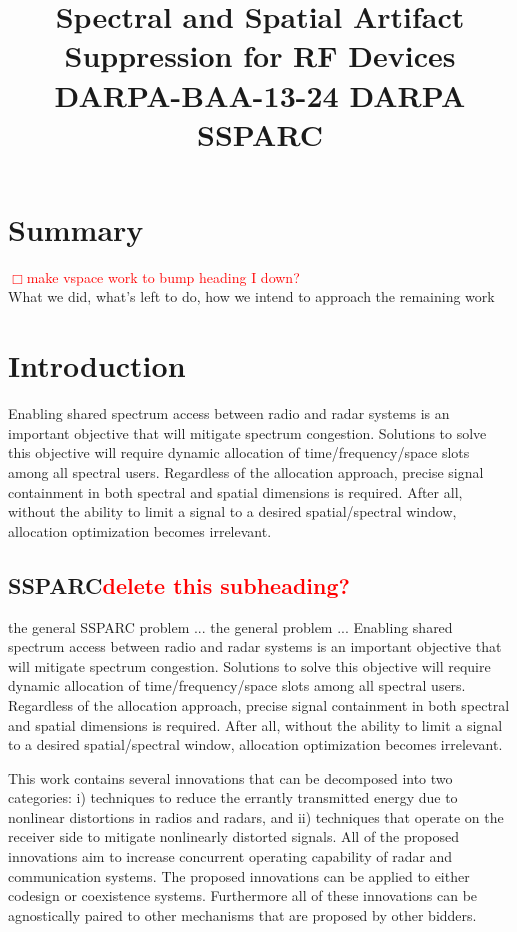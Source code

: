 \documentclass[11pt,onecolumn]{IEEEtran}
\title{\Large{\textbf{Spectral and Spatial Artifact Suppression for RF Devices}\\
DARPA-BAA-13-24 DARPA SSPARC}}
\begin{document}
\vspace{10mm}
\section{Summary} 
\textcolor{red}{$\Box$make vspace work to bump heading I down?}\\What we did, what’s left to do, how we intend to approach the remaining work
\section{Introduction}
Enabling shared spectrum access between radio and radar systems is an important objective that will mitigate spectrum congestion.  Solutions to solve this objective will require dynamic allocation of time/frequency/space slots among all spectral users.  Regardless of the allocation approach, precise signal containment in both spectral and spatial dimensions is required.  After all, without the ability to limit a signal to a desired spatial/spectral window, allocation optimization becomes irrelevant.\par


\subsection{SSPARC\textcolor{red}{delete this subheading?}}
the general SSPARC problem ...
the general \SSPARC problem ...
Enabling shared spectrum access between radio and radar systems is an important objective that will mitigate spectrum congestion.  Solutions to solve this objective will require dynamic allocation of time/frequency/space slots among all spectral users.  Regardless of the allocation approach, precise signal containment in both spectral and spatial dimensions is required.  After all, without the ability to limit a signal to a desired spatial/spectral window, allocation optimization becomes irrelevant.\par

This work contains several innovations that can be decomposed into two categories: i) techniques to reduce the errantly transmitted energy due to nonlinear distortions in \SSPARC radios and radars, and ii) techniques that operate on the receiver side to mitigate nonlinearly distorted signals.  All of the proposed innovations aim to increase concurrent operating capability of radar and communication systems.  The proposed innovations can be applied to either codesign or coexistence \SSPARC systems.  Furthermore all of these innovations can be agnostically paired to other \SSPARC mechanisms that are proposed by other bidders.
\end{document}
